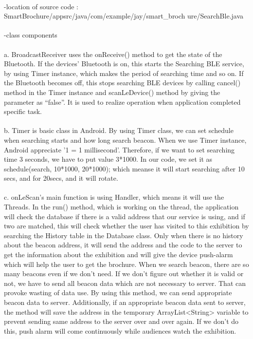 \documentclass[conference]{IEEEtran}
\begin{document}
\\ -location of source code : SmartBrochure/appsrc/java/com/example/jay/smart\_broch
ure/SearchBle.java\\
\\ -class components\\
\\ a. BroadcastReceiver uses the onReceive() method to get the state of the Bluetooth. If the devices’ Bluetooth is on, this starts the Searching BLE service, by using Timer instance, which makes the period of searching time and so on. If the Bluetooth becomes off, this stops searching BLE devices by calling cancel() method in the Timer instance and scanLeDevice() method by giving the parameter as “false”. It is used to realize operation when application completed specific task.\\
\\ b. Timer is basic class in Android. By using Timer class, we can set schedule when searching starts and how long search beacon. When we use Timer instance, Android appreciate '1 = 1 millisecond'. Therefore, if we want to set searching time 3 seconds, we have to put value 3*1000. In our code, we set it as schedule(search, 10*1000, 20*1000); which meanse it will start searching after 10 secs, and for 20secs, and it will rotate.\\
\\ c. onLeScan's main function is using Handler, which means it will use the Threads. In the run() method, which is working on the thread, the application will check the database if there is a valid address that our service is using, and if two are matched, this will check whether the user has visited to this exhibition by searching the History table in the Database class. Only when there is no history about the beacon address, it will send the address and the code to the server to get the information about the exhibition and will give the device push-alarm which will help the user to get the brochure. When we search beacon, there are so many beacons even if we don't need. If we don’t figure out whether it is valid or not, we have to send all beacon data which are not necessary to server. That can provoke wasting of data use. By using this method, we can send appropriate beacon data to server. Additionally, if an appropriate beacon data sent to server, the method will save the address in the temporary ArrayList<String> variable to prevent sending same address to the server over and over again. If we don’t do this, push alarm will come continuously while audiences watch the exhibition.\\
\end{document}
